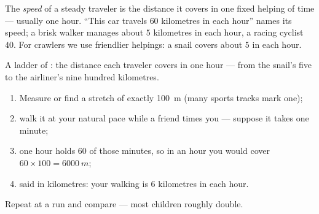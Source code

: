 \begin{definition}[Speed]\label{def:g5:speed-distance-time:speed}
The \emph{speed} of a steady traveler is the distance
it covers in one fixed helping of time --- usually one hour.
``This car travels $60$ kilometres in each hour'' names its speed;
a brisk walker manages about $5$ kilometres in each hour, a
racing cyclist $40$. For crawlers we use friendlier helpings: a
snail covers about $5$  in each hour.
\end{definition}

\begin{omfigure}

{\small A ladder of : the distance each traveler covers in
one hour --- from the snail's five  to the airliner's nine
hundred kilometres.}
\end{omfigure}

\begin{method}\label{met:g5:speed-distance-time:measure}
\begin{enumerate}
  \item Measure or find a stretch of exactly \qty{100}{m} (many
        sports tracks mark one);
  \item walk it at your natural pace while a friend times you ---
        suppose it takes one minute;
  \item one hour holds $60$ of those minutes, so in an hour you
        would cover $60 \times 100 = \qty{6000}{m}$;
  \item said in kilometres: your walking  is $6$ kilometres in
        each hour.
\end{enumerate}
Repeat at a run and compare --- most children roughly double.
\end{method}

